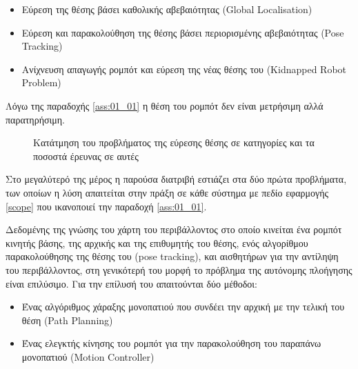 \begin{itemize}
  \item Εύρεση της θέσης βάσει καθολικής αβεβαιότητας (Global Localisation)
  \item Εύρεση και παρακολούθηση της θέσης βάσει περιορισμένης αβεβαιότητας (Pose Tracking)
  \item Ανίχνευση απαγωγής ρομπότ και εύρεση της νέας θέσης του (Kidnapped Robot Problem)
\end{itemize}

\begin{gg_box}
\begin{remark}
  Λόγω της παραδοχής \ref{ass:01_01} η θέση του ρομπότ δεν είναι μετρήσιμη
  αλλά παρατηρήσιμη.
  \label{remark:observable}
\end{remark}
\end{gg_box}

\begin{figure}\centering
  \vspace{-1cm}
  
  \vspace{-2cm}
  \caption{\small Κατάτμηση του προβλήματος της εύρεσης θέσης σε κατηγορίες και
           τα ποσοστά έρευνας σε αυτές}
  \label{fig:localisation_problems_pie}
\end{figure}

Στο μεγαλύτερό της μέρος η παρούσα διατριβή εστιάζει στα δύο πρώτα προβλήματα,
των οποίων η λύση απαιτείται στην πράξη σε κάθε σύστημα με πεδίο εφαρμογής
\ref{scope} που ικανοποιεί την παραδοχή \ref{ass:01_01}.

Δεδομένης της γνώσης του χάρτη του περιβάλλοντος στο οποίο κινείται ένα ρομπότ
κινητής βάσης, της αρχικής και της επιθυμητής του θέσης, ενός αλγορίθμου
παρακολούθησης της θέσης του (pose tracking), και αισθητήρων για την αντίληψη
του περιβάλλοντος, στη γενικότερή του μορφή το πρόβλημα της αυτόνομης πλοήγησης
είναι επιλύσιμο. Για την επίλυσή του απαιτούνται δύο μέθοδοι:

\begin{itemize}
  \item Ένας αλγόριθμος χάραξης μονοπατιού που συνδέει την αρχική με την τελική
        του θέση (Path Planning)
  \item Ένας ελεγκτής κίνησης του ρομπότ για την παρακολούθηση του παραπάνω
        μονοπατιού (Motion Controller)
\end{itemize}


